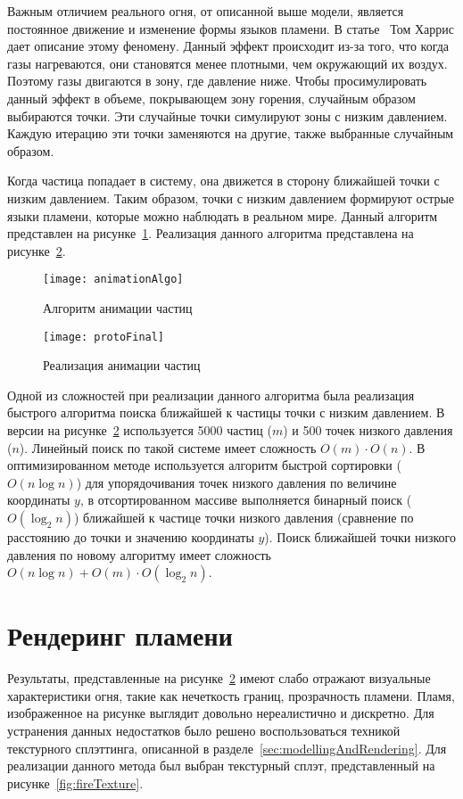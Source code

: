 Важным отличием реального огня, от описанной
выше модели, является постоянное движение и изменение формы языков пламени. В
статье~\cite{Harris} Том Харрис дает описание этому феномену. Данный эффект
происходит из-за того, что когда газы нагреваются, они становятся менее
плотными, чем окружающий их воздух. Поэтому газы двигаются в зону, где давление
ниже. Чтобы просимулировать данный эффект в объеме, покрывающем зону горения,
случайным образом выбираются точки. Эти случайные точки симулируют зоны с
низким давлением. Каждую итерацию эти точки заменяются на другие, также
выбранные случайным образом.

Когда частица попадает в систему, она движется в сторону ближайшей точки с
низким давлением. Таким образом, точки с низким давлением формируют острые языки
пламени, которые можно наблюдать в реальном мире. Данный алгоритм представлен на
рисунке~\ref{fig:animationAlgo}. Реализация данного алгоритма представлена на
рисунке~\ref{fig:protoFinal}.
\begin{figure}[htb]
	\centering
    \texttt{[image: animationAlgo]}
    \caption{Алгоритм анимации частиц}%
    \label{fig:animationAlgo}
\end{figure}
\begin{figure}[htb]
	\centering
    \texttt{[image: protoFinal]}
    \caption{Реализация анимации частиц}%
    \label{fig:protoFinal}
\end{figure}

Одной из сложностей при реализации данного алгоритма была реализация быстрого
алгоритма поиска ближайшей к частицы точки с низким давлением. В версии на
рисунке~\ref{fig:protoFinal} используется 5000 частиц ($m$) и 500 точек низкого
давления ($n$). Линейный поиск по такой системе имеет сложность
$O(m) \cdot O(n)$.
В оптимизированном методе используется алгоритм быстрой сортировки
($O(n \log n)$) для упорядочивания точек низкого давления по величине
координаты $y$, в отсортированном массиве выполняется бинарный поиск
($O(\log_{2} n)$) ближайшей к частице точки низкого давления (сравнение по
расстоянию до точки и значению координаты $y$). Поиск ближайшей точки низкого
давления по новому алгоритму имеет сложность
$O(n \log n) + O(m) \cdot O(\log_{2} n)$.

\section{Рендеринг пламени}

Результаты, представленные на рисунке~\ref{fig:protoFinal} имеют слабо отражают
визуальные характеристики огня, такие как нечеткость границ, прозрачность
пламени. Пламя, изображенное на рисунке выглядит довольно нереалистично и
дискретно. Для устранения данных недостатков было решено воспользоваться
техникой текстурного сплэттинга, описанной в
разделе~\ref{sec:modellingAndRendering}. Для реализации данного метода был
выбран текстурный сплэт, представленный на рисунке~\ref{fig:fireTexture}.


